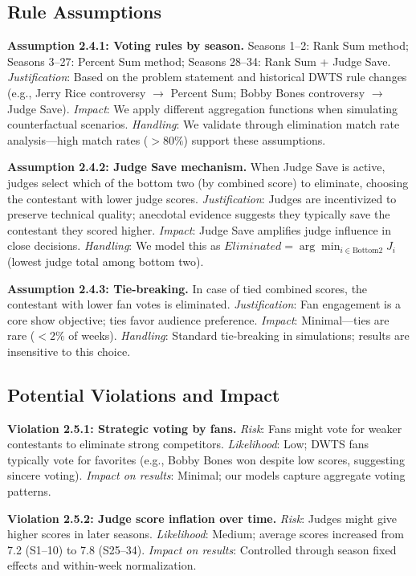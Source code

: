 \documentclass{mcmthesis}
\begin{document}
\subsection{Rule Assumptions}

\textbf{Assumption 2.4.1: Voting rules by season.}
Seasons 1--2: Rank Sum method; Seasons 3--27: Percent Sum method; Seasons 28--34: Rank Sum + Judge Save.
\textit{Justification}: Based on the problem statement and historical DWTS rule changes (e.g., Jerry Rice controversy $\to$ Percent Sum; Bobby Bones controversy $\to$ Judge Save).
\textit{Impact}: We apply different aggregation functions when simulating counterfactual scenarios.
\textit{Handling}: We validate through elimination match rate analysis---high match rates ($>80\%$) support these assumptions.

\textbf{Assumption 2.4.2: Judge Save mechanism.}
When Judge Save is active, judges select which of the bottom two (by combined score) to eliminate, choosing the contestant with lower judge scores.
\textit{Justification}: Judges are incentivized to preserve technical quality; anecdotal evidence suggests they typically save the contestant they scored higher.
\textit{Impact}: Judge Save amplifies judge influence in close decisions.
\textit{Handling}: We model this as $Eliminated = \arg\min_{i \in \text{Bottom2}} J_i$ (lowest judge total among bottom two).

\textbf{Assumption 2.4.3: Tie-breaking.}
In case of tied combined scores, the contestant with lower fan votes is eliminated.
\textit{Justification}: Fan engagement is a core show objective; ties favor audience preference.
\textit{Impact}: Minimal---ties are rare ($<2\%$ of weeks). \textit{Handling}: Standard tie-breaking in simulations; results are insensitive to this choice.

\subsection{Potential Violations and Impact}

\textbf{Violation 2.5.1: Strategic voting by fans.}
\textit{Risk}: Fans might vote for weaker contestants to eliminate strong competitors.
\textit{Likelihood}: Low; DWTS fans typically vote for favorites (e.g., Bobby Bones won despite low scores, suggesting sincere voting).
\textit{Impact on results}: Minimal; our models capture aggregate voting patterns.

\textbf{Violation 2.5.2: Judge score inflation over time.}
\textit{Risk}: Judges might give higher scores in later seasons.
\textit{Likelihood}: Medium; average scores increased from 7.2 (S1--10) to 7.8 (S25--34).
\textit{Impact on results}: Controlled through season fixed effects and within-week normalization.
\end{document}
